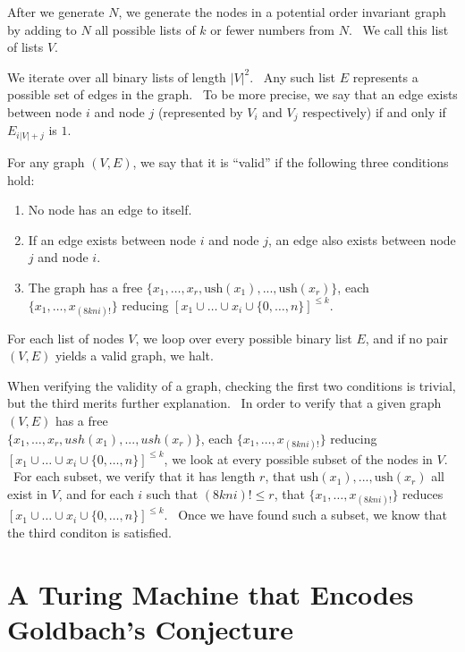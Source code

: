 \documentclass[11pt]{article}
\begin{document}
After we generate $N$, we generate the nodes in a potential order invariant graph by adding to $N$ all possible lists of $k$ or fewer numbers from $N$. \ We call this list of lists $V$.

We iterate over all binary lists of length $|V|^2$. \ Any such list $E$ represents a possible set of edges in the graph. \ To be more precise, we say that an edge exists between node $i$ and node $j$ (represented by $V_i$ and $V_j$ respectively) if and only if $E_{i|V| + j}$ is $1$.

For any graph $(V, E)$, we say that it is ``valid'' if the following three conditions hold:

\begin{enumerate}

\item No node has an edge to itself.
\item If an edge exists between node $i$ and node $j$, an edge also exists between node $j$ and node $i$.
\item The graph has a free $\{x_1,\dots,x_r, \textrm{ush}(x_1),...,\textrm{ush}(x_r)\}$, each  $\{x_1, \dots, x_{(8kni)!}\}$ reducing $[x_1 \cup \dots \cup x_i \cup \{0,\dots,n\}]^{\le k}$.

\end{enumerate}

For each list of nodes $V$, we loop over every possible binary list $E$, and if no pair $(V, E)$ yields a valid graph, we halt.

When verifying the validity of a graph, checking the first two conditions is trivial, but the third merits further explanation. \ In order to verify that a given graph $(V, E)$ has a free \\ $\{x_1,\dots,x_r, ush(x_1),...,ush(x_r)\}$, each  $\{x_1, \dots, x_{(8kni)!}\}$ reducing $[x_1 \cup \dots \cup x_i \cup \{0,\dots,n\}]^{\le k}$, we look at every possible subset of the nodes in $V$. \ For each subset, we verify that it has length $r$, that $\textrm{ush}(x_1),...,\textrm{ush}(x_r)$ all exist in $V$, and for each $i$ such that $(8kni)! \le r$, that $\{x_1, \dots, x_{(8kni)!}\}$ reduces $[x_1 \cup \dots \cup x_i \cup \{0,\dots,n\}]^{\le k}$. \ Once we have found such a subset, we know that the third conditon is satisfied.

\section{A Turing Machine that Encodes Goldbach's Conjecture} \label{sec:g}
\end{document}
